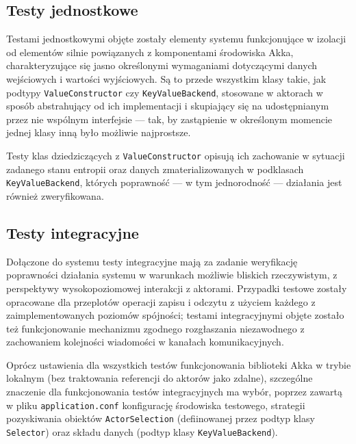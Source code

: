 \subsection{Testy jednostkowe} \label{subsection:unittests}

Testami jednostkowymi objęte zostały elementy systemu funkcjonujące w izolacji od elementów silnie powiązanych z komponentami środowiska Akka, charakteryzujące się jasno określonymi wymaganiami dotyczącymi danych wejściowych i wartości wyjściowych. Są to przede wszystkim klasy takie, jak podtypy \texttt{ValueConstructor} czy \texttt{KeyValueBackend}, stosowane w aktorach w sposób abstrahujący od ich implementacji i skupiający się na udostępnianym przez nie wspólnym interfejsie --- tak, by zastąpienie w określonym momencie jednej klasy inną było możliwie najprostsze.

Testy klas dziedziczących z \texttt{ValueConstructor} opisują ich zachowanie w sytuacji zadanego stanu entropii oraz danych zmaterializowanych w podklasach \texttt{KeyValueBackend}, których poprawność --- w tym jednorodność --- działania jest również zweryfikowana.

\subsection{Testy integracyjne} \label{subsection:integrationtests}

Dołączone do systemu testy integracyjne mają za zadanie weryfikację poprawności działania systemu w warunkach możliwie bliskich rzeczywistym, z perspektywy wysokopoziomowej interakcji z aktorami. Przypadki testowe zostały opracowane dla przeplotów operacji zapisu i odczytu z użyciem każdego z zaimplementowanych poziomów spójności; testami integracyjnymi objęte zostało też funkcjonowanie mechanizmu zgodnego rozgłaszania niezawodnego z zachowaniem kolejności wiadomości w kanałach komunikacyjnych.

Oprócz ustawienia dla wszystkich testów funkcjonowania biblioteki Akka w trybie lokalnym (bez traktowania referencji do aktorów jako zdalne), szczególne znaczenie dla funkcjonowania testów integracyjnych ma wybór, poprzez zawartą w pliku \texttt{application.conf} konfigurację środowiska testowego, strategii pozyskiwania obiektów \texttt{ActorSelection} (defiinowanej przez podtyp klasy \texttt{Selector}) oraz składu danych (podtyp klasy \texttt{KeyValueBackend}).

